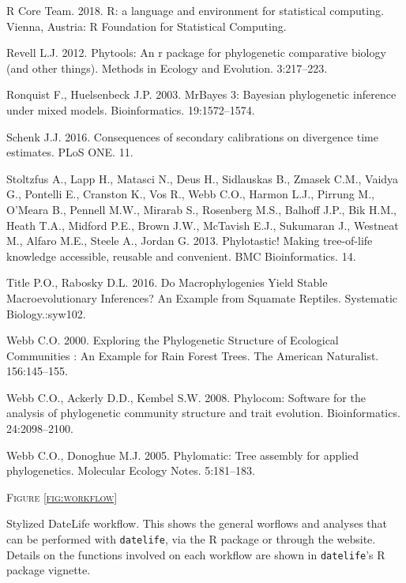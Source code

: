 \documentclass[]{article}
\begin{document}
\leavevmode\hypertarget{ref-RCoreTeam2018}{}%
R Core Team. 2018. R: a language and environment for statistical computing. Vienna, Austria: R Foundation for Statistical Computing.

\leavevmode\hypertarget{ref-Revell2012}{}%
Revell L.J. 2012. Phytools: An r package for phylogenetic comparative biology (and other things). Methods in Ecology and Evolution. 3:217--223.

\leavevmode\hypertarget{ref-Ronquist2003}{}%
Ronquist F., Huelsenbeck J.P. 2003. MrBayes 3: Bayesian phylogenetic inference under mixed models. Bioinformatics. 19:1572--1574.

\leavevmode\hypertarget{ref-schenk2016sec}{}%
Schenk J.J. 2016. Consequences of secondary calibrations on divergence time estimates. PLoS ONE. 11.

\leavevmode\hypertarget{ref-Stoltzfus2013}{}%
Stoltzfus A., Lapp H., Matasci N., Deus H., Sidlauskas B., Zmasek C.M., Vaidya G., Pontelli E., Cranston K., Vos R., Webb C.O., Harmon L.J., Pirrung M., O'Meara B., Pennell M.W., Mirarab S., Rosenberg M.S., Balhoff J.P., Bik H.M., Heath T.A., Midford P.E., Brown J.W., McTavish E.J., Sukumaran J., Westneat M., Alfaro M.E., Steele A., Jordan G. 2013. Phylotastic! Making tree-of-life knowledge accessible, reusable and convenient. BMC Bioinformatics. 14.

\leavevmode\hypertarget{ref-title2016macrophylogenies}{}%
Title P.O., Rabosky D.L. 2016. Do Macrophylogenies Yield Stable Macroevolutionary Inferences? An Example from Squamate Reptiles. Systematic Biology.:syw102.

\leavevmode\hypertarget{ref-Webb2000}{}%
Webb C.O. 2000. Exploring the Phylogenetic Structure of Ecological Communities : An Example for Rain Forest Trees. The American Naturalist. 156:145--155.

\leavevmode\hypertarget{ref-Webb2008}{}%
Webb C.O., Ackerly D.D., Kembel S.W. 2008. Phylocom: Software for the analysis of phylogenetic community structure and trait evolution. Bioinformatics. 24:2098--2100.

\leavevmode\hypertarget{ref-webb2005phylomatic}{}%
Webb C.O., Donoghue M.J. 2005. Phylomatic: Tree assembly for applied phylogenetics. Molecular Ecology Notes. 5:181--183.

\newpage

\begin{center}
\textsc{Figure \ref{fig:workflow}}
\end{center}
Stylized DateLife workflow. This shows the general worflows and analyses that can be performed with \texttt{datelife}, via the R package or through the website. Details on the functions involved on each workflow are shown in \texttt{datelife}'s R package vignette.
\end{document}
